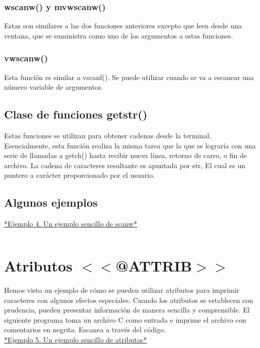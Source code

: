 \documentclass{article}
\begin{document}
\subsubsection{wscanw() y mvwscanw()}%
Estas son similares a las dos funciones anteriores excepto que leen desde una
ventana, que se suministra como uno de los argumentos a estas funciones.

\subsubsection{vwscanw()}%
Esta función es similar a vscanf(). Se puede utilizar cuando se va a escanear
una número variable de argumentos.

\subsection{Clase de funciones getstr()}%
Estas funciones se utilizan para obtener cadenas desde la terminal.
Esencialmente, esta función realiza la misma tarea que la que se lograría con
una serie de llamadas a getch() hasta recibir nueva línea, retorno de carro, o
fin de archivo. La cadena de caracteres resultante es apuntada por str, El cual
es un puntero a carácter proporcionado por el usuario.

\subsection{Algunos ejemplos}%

\href{https://github.com/nasciiboy/NCURSES-Programming-HOWTO/blob/master/ncurses_programs/basics/scanw_example.c}{*Ejemplo 4. Un ejemplo sencillo de scanw*}
\inputminted{cpp}{./cpp/004_scanw.cpp}

\section{Atributos $<<$@ATTRIB$>>$}%
Hemos visto un ejemplo de cómo se pueden utilizar atributos para imprimir
caracteres con algunos efectos especiales. Cuando los atributos se establecen
con prudencia, pueden presentar información de manera sencilla y comprensible.
El siguiente programa toma un archivo C como entrada e imprime el archivo con
comentarios en negrita. Escanea a través del código.\\

\href{https://github.com/nasciiboy/NCURSES-Programming-HOWTO/blob/master/ncurses_programs/basics/simple_attr.c}{*Ejemplo 5. Un ejemplo sencillo de atributos*}
\inputminted{cpp}{./cpp/005_atributos.cpp}
\end{document}
